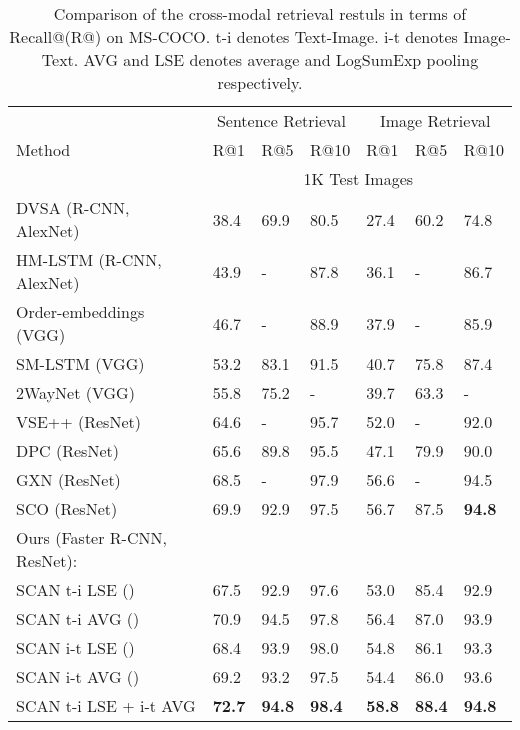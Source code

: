 \documentclass[runningheads]{llncs}
\begin{document}
\begin{table}[t!]
\begin{center}
\caption{Comparison of the cross-modal retrieval restuls in terms of Recall@(R@) on MS-COCO. t-i denotes Text-Image. i-t denotes Image-Text. AVG and LSE denotes average and LogSumExp pooling respectively.}
\label{table:mscoco}
\begin{tabular}
{p{5.0cm}p{1.0cm}p{1.0cm}p{1.0cm}p{1.0cm}p{1.0cm}p{1.0cm}}
\hline\noalign{\smallskip}
 & \multicolumn{3}{c}{Sentence Retrieval} & \multicolumn{3}{c}{Image Retrieval} \\
Method & R@1 & R@5 & R@10 & R@1 & R@5 & R@10 \\
\noalign{\smallskip}
\hline
\noalign{\smallskip}
& \multicolumn{6}{c}{1K Test Images} \\ 
\hline
\hline
DVSA (R-CNN, AlexNet) \cite{karpathy2015deep} & 38.4 & 69.9 & 80.5 & 27.4 & 60.2 & 74.8 \\ 
HM-LSTM (R-CNN, AlexNet) \cite{niu2017hierarchical} & 43.9 & - & 87.8 & 36.1 & - & 86.7 \\ 
Order-embeddings (VGG) \cite{vendrov2015order} & 46.7 & - & 88.9 & 37.9 & - & 85.9 \\ 
SM-LSTM (VGG) \cite{huang2017instance} & 53.2 & 83.1 & 91.5 & 40.7 & 75.8 & 87.4 \\ 
2WayNet (VGG) \cite{eisenschtat2017linking} & 55.8 & 75.2 & - & 39.7 & 63.3 & - \\ 
VSE++ (ResNet) \cite{faghri2017vse++} & 64.6 & - & 95.7 & 52.0 & - & 92.0 \\ 
DPC (ResNet) \cite{zheng2017dual} & 65.6 & 89.8 & 95.5 & 47.1 & 79.9 & 90.0 \\ 
GXN (ResNet) \cite{gu2017look} & 68.5 & - & 97.9 & 56.6 & - & 94.5 \\ 
SCO (ResNet) \cite{huang2017learning} & 69.9 & 92.9 & 97.5 & 56.7 & 87.5 & \textbf{94.8} \\ 
\hline
Ours (Faster R-CNN, ResNet):  \\ 
SCAN t-i LSE ()  & 67.5 & 92.9 & 97.6 & 53.0 & 85.4 & 92.9 \\ 
SCAN t-i AVG () & 70.9 & 94.5 & 97.8 & 56.4 & 87.0 & 93.9  \\ 
SCAN i-t LSE () & 68.4 & 93.9 & 98.0 & 54.8 & 86.1 & 93.3 \\ 
SCAN i-t AVG () & 69.2 & 93.2 & 97.5 & 54.4 & 86.0 & 93.6 \\ 
SCAN t-i LSE + i-t AVG & \textbf{72.7} & \textbf{94.8} & \textbf{98.4} & \textbf{58.8} & \textbf{88.4} & \textbf{94.8} \\ 

\end{tabular}
\end{center}
\end{table}
\end{document}
